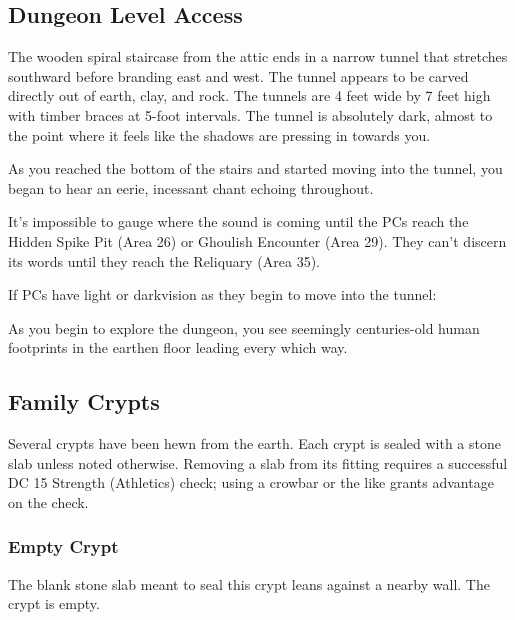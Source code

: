 \pagebreak
\subsection{Dungeon Level Access}
\label{sec:DungeonLevelAccess}
\begin{readout}
  The wooden spiral staircase from the attic ends in a narrow tunnel that stretches southward before branding east
  and west. The tunnel appears to be carved directly out of earth, clay, and rock. The tunnels are 4 feet wide by
  7 feet high with timber braces at 5-foot intervals. The tunnel is absolutely dark, almost to the point where
  it feels like the shadows are pressing in towards you.
  
  As you reached the bottom of the stairs and started moving into the tunnel, you began to hear an eerie, incessant
  chant echoing throughout.
\end{readout}
It's impossible to gauge where the sound is coming until the PCs reach the Hidden Spike Pit (Area 26) or Ghoulish
Encounter (Area 29). They can't discern its words until they reach the Reliquary (Area 35).

If PCs have light or darkvision as they begin to move into the tunnel:
\begin{readout}
  As you begin to explore the dungeon, you see seemingly centuries-old human footprints in the earthen floor
  leading every which way.
\end{readout}

\begin{arealinks}
\end{arealinks}


\pagebreak
\subsection{Family Crypts}
\label{sec:FamilyCrypts}
Several crypts have been hewn from the earth. Each crypt is sealed with a stone slab unless noted otherwise.
Removing a slab from its fitting requires a successful DC 15 Strength (Athletics) check; using a crowbar or
the like grants advantage on the check.

\subsubsection{Empty Crypt}
\begin{readout}
  The blank stone slab meant to seal this crypt leans against a nearby wall. The crypt is empty.
\end{readout}

